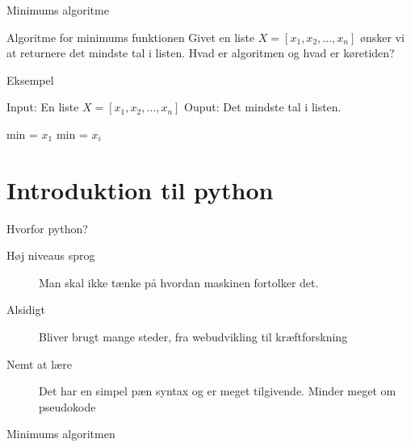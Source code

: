 \documentclass[12pt,t]{beamer}
\begin{document}
    \begin{frame}{Minimums algoritme}
        \transdissolve
        \begin{exampleblock}{Algoritme for minimums funktionen}
            Givet en liste $X = [x_1,x_2,\dots,x_n]$ ønsker vi at returnere det
            mindste tal i listen. Hvad er algoritmen og hvad er køretiden?
        \end{exampleblock}
        \begin{block}{Eksempel}
        \vspace{-1.5em}
        \begin{algorithm}[H]
            \caption{\newline Input: En liste $X=[x_1,x_2, \dots, x_n]$
                     \newline Ouput: Det mindste tal i listen.
            }
            \begin{algorithmic}
                \State min = $x_1$
                        \State min = $x_i$
                    \EndIf
                \EndFor
            \end{algorithmic}
        \end{algorithm}
        \end{block}
    \end{frame}
%
 \section{Introduktion til python}
     \frame{\tableofcontents[currentsection]}

     \begin{frame}[t]{Hvorfor python?}
         \begin{description}
             \item[Høj niveaus sprog] Man skal ikke tænke på hvordan
             maskinen fortolker det.
             \pause
             \item[Alsidigt] Bliver brugt mange steder,
             fra webudvikling til kræftforskning
             \pause
             \item[Nemt at lære] Det har en simpel pæn syntax og er meget
             tilgivende. Minder meget om pseudokode
         \end{description}
         \pause
         \begin{block}{Minimums algoritmen}
               \inputminted{python}{min.py}
        \end{block}
     \end{frame}
\end{document}
